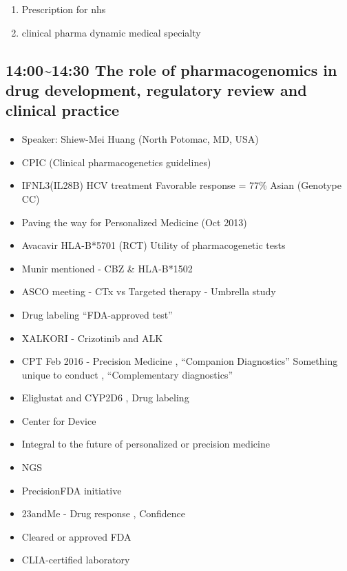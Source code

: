 \documentclass[]{book}
\providecommand{\tightlist}{%
  \setlength{\itemsep}{0pt}\setlength{\parskip}{0pt}}
\begin{document}
\begin{enumerate}
\def\labelenumi{\arabic{enumi}.}
\tightlist
\item
  Prescription for nhs
\item
  clinical pharma dynamic medical specialty
\end{enumerate}

\subsection{14:00\textasciitilde{}14:30 The role of pharmacogenomics in
drug development, regulatory review and clinical
practice}\label{the-role-of-pharmacogenomics-in-drug-development-regulatory-review-and-clinical-practice}

\begin{itemize}
\tightlist
\item
  Speaker: Shiew-Mei Huang (North Potomac, MD, USA)
\item
  CPIC (Clinical pharmacogenetics guidelines)
\item
  IFNL3(IL28B) HCV treatment Favorable response = 77\% Asian (Genotype
  CC)
\item
  Paving the way for Personalized Medicine (Oct 2013)
\item
  Avacavir HLA-B*5701 (RCT) Utility of pharmacogenetic tests
\item
  Munir mentioned - CBZ \& HLA-B*1502
\item
  ASCO meeting - CTx vs Targeted therapy - Umbrella study
\item
  Drug labeling ``FDA-approved test''
\item
  XALKORI - Crizotinib and ALK
\item
  CPT Feb 2016 - Precision Medicine , ``Companion Diagnostics''
  Something unique to conduct , ``Complementary diagnostics''
\item
  Eliglustat and CYP2D6 , Drug labeling
\item
  Center for Device
\item
  Integral to the future of personalized or precision medicine
\item
  NGS
\item
  PrecisionFDA initiative
\item
  23andMe - Drug response , Confidence
\item
  Cleared or approved FDA
\item
  CLIA-certified laboratory
\end{itemize}
\end{document}

